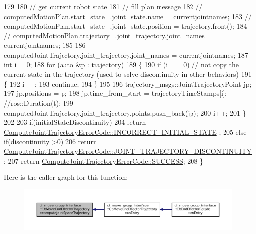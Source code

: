 \begin{DoxyCode}
179 
180         \textcolor{comment}{// get current robot state}
181         \textcolor{comment}{// fill plan message}
182         \textcolor{comment}{// computedMotionPlan.start\_state\_.joint\_state.name = currentjointnames;}
183         \textcolor{comment}{// computedMotionPlan.start\_state\_.joint\_state.position = trajectory.front();}
184         \textcolor{comment}{// computedMotionPlan.trajectory\_.joint\_trajectory.joint\_names = currentjointnames;}
185 
186         computedJointTrajectory.joint\_trajectory.joint\_names = currentjointnames;
187         \textcolor{keywordtype}{int} i = 0;
188         \textcolor{keywordflow}{for} (\textcolor{keyword}{auto} &p : trajectory)
189         \{
190             \textcolor{keywordflow}{if} (i == 0) \textcolor{comment}{// not copy the current state in the trajectory (used to solve discontinuity in
       other behaviors)}
191             \{
192                 i++;
193                 \textcolor{keywordflow}{continue};
194             \}
195 
196             trajectory\_msgs::JointTrajectoryPoint jp;
197             jp.positions = p;
198             jp.time\_from\_start = trajectoryTimeStamps[i]; \textcolor{comment}{//ros::Duration(t);}
199             computedJointTrajectory.joint\_trajectory.points.push\_back(jp);
200             i++;
201         \}
202 
203         \textcolor{keywordflow}{if}(initialStateDiscontinuity)
204             \textcolor{keywordflow}{return} \hyperlink{namespacecl__move__group__interface_ae5fc1caf9a16ae5ad1c97c2e137a7017a1b748367c8d468cb9b65ecd6b2eab32c}{ComputeJointTrajectoryErrorCode::INCORRECT\_INITIAL\_STATE}
      ;
205         \textcolor{keywordflow}{else} \textcolor{keywordflow}{if}(discontinuity >0)
206             \textcolor{keywordflow}{return} 
      \hyperlink{namespacecl__move__group__interface_ae5fc1caf9a16ae5ad1c97c2e137a7017a3e86842785cd7c42003e516418347c8e}{ComputeJointTrajectoryErrorCode::JOINT\_TRAJECTORY\_DISCONTINUITY}
      ;
207         \textcolor{keywordflow}{return} \hyperlink{namespacecl__move__group__interface_ae5fc1caf9a16ae5ad1c97c2e137a7017ad0749aaba8b833466dfcbb0428e4f89c}{ComputeJointTrajectoryErrorCode::SUCCESS};
208     \}
\end{DoxyCode}
Here is the caller graph for this function\+:
\nopagebreak
\begin{figure}[H]
\begin{center}
\leavevmode
\includegraphics[width=350pt]{classcl__move__group__interface_1_1CbMoveEndEffectorTrajectory_a485057c052729edd3e8303440b7ada66_icgraph}
\end{center}
\end{figure}
